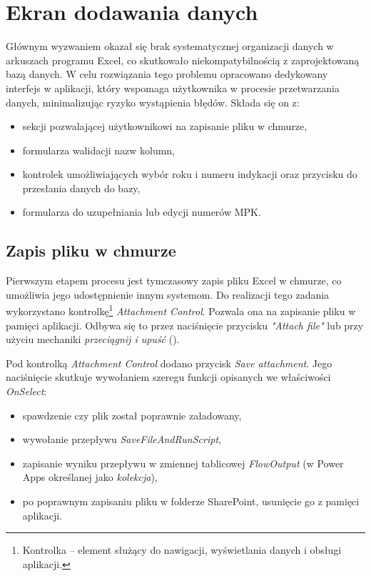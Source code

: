 \section{Ekran dodawania danych}

Głównym wyzwaniem okazał się brak systematycznej organizacji danych w arkuszach programu
Excel, co skutkowało niekompatybilnością z zaprojektowaną bazą danych. W celu rozwiązania tego
problemu opracowano dedykowany interfejs w aplikacji, który wspomaga użytkownika w procesie
przetwarzania danych, minimalizując ryzyko wystąpienia błędów. Składa się on z:
\begin{itemize}
    \item sekcji pozwalającej użytkownikowi na zapisanie pliku w chmurze,
    \item formularza walidacji nazw kolumn,
    \item kontrolek umożliwiających wybór roku i numeru indykacji oraz przycisku do przesłania danych do bazy,
    \item formularza do uzupełniania lub edycji numerów MPK.
\end{itemize}


\subsection{Zapis pliku w chmurze}
Pierwszym etapem procesu jest tymczasowy zapis pliku Excel w chmurze, co umożliwia jego udostępnienie innym systemom. Do realizacji tego zadania wykorzystano kontrolkę\footnote{Kontrolka -- element służący do nawigacji, wyświetlania danych i obsługi aplikacji.} \emph{Attachment Control}. Pozwala ona na zapisanie pliku w pamięci aplikacji. Odbywa się to przez naciśnięcie przycisku \emph{"Attach file"} lub przy użyciu mechaniki \emph{przeciągnij i upuść} ().

Pod kontrolką \emph{Attachment Control} dodano przycisk \emph{Save attachment}. Jego naciśnięcie skutkuje wywołaniem szeregu funkcji opisanych we właściwości \emph{OnSelect}:
\begin{itemize}
    \item spawdzenie czy plik został poprawnie załadowany,
    \item wywołanie przepływu \emph{SaveFileAndRunScript},
    \item zapisanie wyniku przepływu w zmiennej tablicowej \emph{FlowOutput} (w Power Apps określanej jako \emph{kolekcja}),
    \item po poprawnym zapisaniu pliku w folderze SharePoint, usunięcie go z pamięci aplikacji.
\end{itemize}

